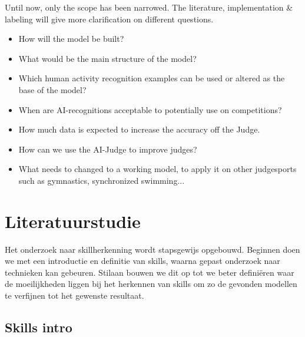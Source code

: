 Until now, only the scope has been narrowed. The literature, implementation \& labeling will give more clarification on different questions.

\begin{itemize}
    \item How will the model be built?
    \item What would be the main structure of the model?
    \item Which human activity recognition examples can be used or altered as the base of the model?
    \item When are AI-recognitions acceptable to potentially use on competitions?
    \item How much data is expected to increase the accuracy off the Judge.
    \item How can we use the AI-Judge to improve judges?
    \item What needs to changed to a working model, to apply it on other judgesports such as gymnastics, synchronized swimming...
\end{itemize}


\section{Literatuurstudie}%
\label{sec:literatuurstudie}


    
Het onderzoek naar skillherkenning wordt stapsgewijs opgebouwd. Beginnen doen we met een introductie en definitie van skills, waarna gepast onderzoek naar technieken kan gebeuren. Stilaan bouwen we dit op tot we beter definiëren waar de moeilijkheden liggen bij het herkennen van skills om zo de gevonden modellen te verfijnen tot het gewenste resultaat.

\subsection{Skills intro}
\label{subsec:basisskills}

